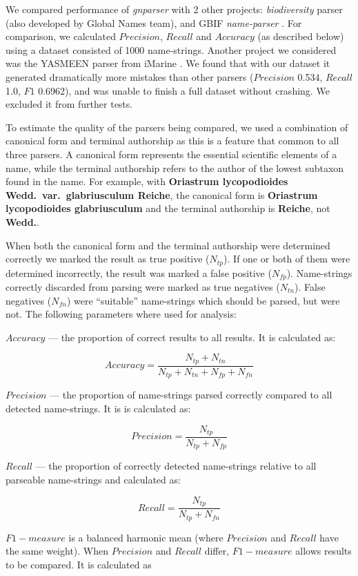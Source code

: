 \documentclass{bmcart}
\begin{document}
We compared performance of \textit{gnparser} with 2 other projects:
\textit{biodiversity} parser \cite{Boyle2013, biodiversity} (also developed by
Global Names team), and GBIF \textit{name-parser} \cite{gbifNameParser}. For
comparison, we calculated $Precision$, $Recall$ and $Accuracy$ (as described
below) using a dataset consisted of 1000 name-strings. Another project we
considered was the YASMEEN parser from iMarine  \cite{VandenBerghe2015}. We
found that with our dataset it generated dramatically more mistakes than other
parsers ($Precision$ 0.534, $Recall$ 1.0, $F1$ 0.6962), and was unable to
finish a full dataset without crashing. We excluded it from further tests.

To estimate the quality of the parsers being compared, we used a combination of
canonical form and terminal authorship as this is a feature that common to all
three parsers.  A canonical form represents the essential scientific elements
of a name, while the terminal authorship refers to the author of the lowest
subtaxon found in the name. For example, with \textbf{Oriastrum
lycopodioides Wedd.\ var.\ glabriusculum Reiche}, the canonical form is
\textbf{Oriastrum lycopodioides glabriusculum} and the terminal authorship is
\textbf{Reiche}, not \textbf{Wedd.}.

When both the canonical form and the terminal authorship were determined
correctly we marked the result as true positive ($N_{tp}$).  If one or both of
them were determined incorrectly, the result was marked a false positive
($N_{fp}$). Name-strings correctly discarded from parsing were marked as true
negatives ($N_{tn}$). False negatives ($N_{fn}$) were ``suitable''
name-strings which should be parsed, but were not. The following parameters
where used for analysis:

$Accuracy$ --- the proportion of correct results to all results.  It is
calculated as:

\[Accuracy = \dfrac{N_{tp} + N_{tn}}{N_{tp} + N_{tn} + N_{fp} + N_{fn}}\]

$Precision$ --- the proportion of name-strings parsed correctly compared to
all detected name-strings. It is is calculated as:

\[Precision = \dfrac{N_{tp}}{N_{tp} + N_{fp}}\]

$Recall$ --- the proportion of correctly detected name-strings relative to
all parseable name-strings and calculated as:

\[Recall = \dfrac{N_{tp}}{N_{tp} + N_{fn}}\]

$F1-measure$ is a balanced harmonic mean (where $Precision$ and $Recall$ have
the same weight). When $Precision$ and $Recall$ differ, $F1-measure$ allows
results to be compared. It is calculated as
\end{document}
